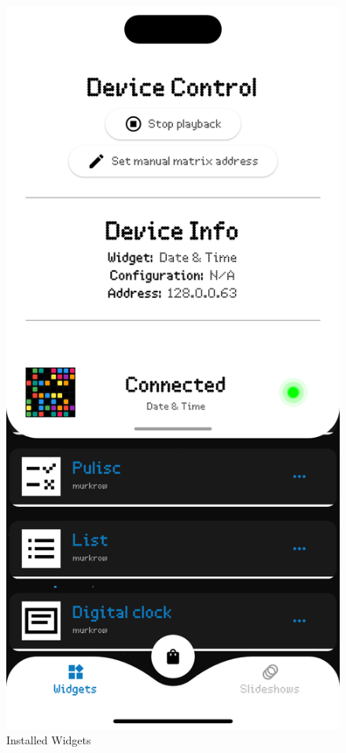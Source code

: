 \begin{figure}[h]
\begin{minipage}[b]{0.24\textwidth}
        \caption*{Installed Widgets}
    \end{minipage}
    \begin{minipage}[b]{0.24\textwidth}
        \centering
        \includegraphics[width=\textwidth]{tesi/img/client_demo/matrix_control.png}

\end{minipage}
\end{figure}

